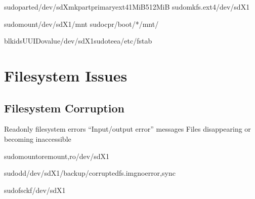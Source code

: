 \documentclass[letterpaper,10pt,english]{sphinxmanual}
\begin{document}
\sphinxAtStartPar
{}

\begin{sphinxVerbatim}[commandchars=\\\{\}]
sudoparted/dev/sdXmkpartprimaryext41MiB512MiB
sudomkfs.ext4/dev/sdX1

sudomount/dev/sdX1/mnt
sudocp\PYGZhy{}r/boot/*/mnt/

blkid\PYGZhy{}sUUID\PYGZhy{}ovalue/dev/sdX1sudotee\PYGZhy{}a/etc/fstab
\end{sphinxVerbatim}


\section{Filesystem Issues}
\label{\detokenize{troubleshooting:filesystem-issues}}

\subsection{Filesystem Corruption}
\label{\detokenize{troubleshooting:filesystem-corruption}}
\sphinxAtStartPar
{}
\sphinxhyphen{} Read\sphinxhyphen{}only filesystem errors
\sphinxhyphen{} “Input/output error” messages
\sphinxhyphen{} Files disappearing or becoming inaccessible

\sphinxAtStartPar
{}

\begin{sphinxVerbatim}[commandchars=\\\{\}]
sudomount\PYGZhy{}oremount,ro/dev/sdX1

sudodd/dev/sdX1/backup/corrupted\PYGZhy{}fs.imgnoerror,sync

sudofsck\PYGZhy{}f/dev/sdX1
\end{sphinxVerbatim}
\end{document}
